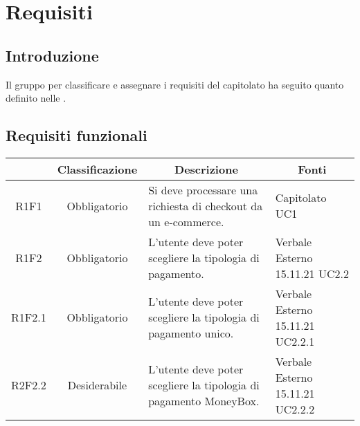 \section{Requisiti} \label{section:requisiti}

\subsection{Introduzione}
Il gruppo \groupName{} per classificare e assegnare i requisiti del capitolato ha seguito quanto definito nelle \docNameVersionNdP{}.

\subsection{Requisiti funzionali} \label{subsection:requisiti_funzionali}
\begin{table}[H]
    \centering
    \renewcommand{\arraystretch}{1.8}
    \begin{tabular}{c | c | p{6cm} | p{4.1cm}}
        \rowcolor[HTML]{125E28}
        \multicolumn{1}{c}{\color[HTML]{FFFFFF} \textbf{Codice}}          &
        \multicolumn{1}{c}{\color[HTML]{FFFFFF} \textbf{Classificazione}} &
        \multicolumn{1}{c}{\color[HTML]{FFFFFF} \textbf{Descrizione}}     &
        \multicolumn{1}{c}{\color[HTML]{FFFFFF} \textbf{Fonti}}                                                                                                                                                                  \\
        \hline
        R1F1                                                              & Obbligatorio & Si deve processare una richiesta di checkout da un e-commerce\glo{}.                          & Capitolato UC1                        \\
        R1F2                                                              & Obbligatorio & L'utente deve poter scegliere la tipologia di pagamento.                                      & Verbale Esterno 15.11.21 UC2.2        \\
        R1F2.1                                                            & Obbligatorio & L'utente deve poter scegliere la tipologia di pagamento unico.                                & Verbale Esterno 15.11.21 UC2.2.1      \\
        R2F2.2                                                            & Desiderabile & L'utente deve poter scegliere la tipologia di pagamento MoneyBox\glo{}.                       & Verbale Esterno 15.11.21 UC2.2.2      \\

\end{tabular}
\end{table}
